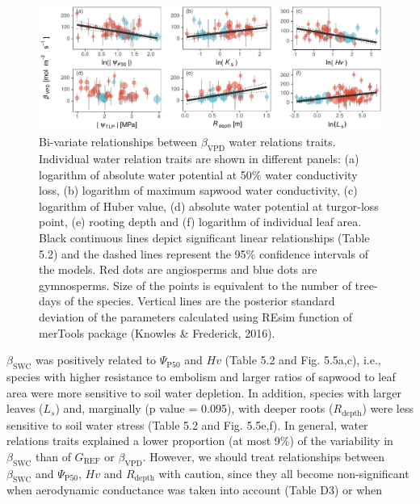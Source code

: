 \documentclass[11pt,twoside]{reedthesis}
\begin{document}
\begin{figure}[hbt!]

{\centering \includegraphics[width=1\linewidth]{figure/CH5/Figure_4} 

}

\caption[Bi-variate relationships between $\beta_{\text{VPD}}$ water relations traits.]{Bi-variate relationships between $\beta_{\text{VPD}}$ water relations traits. Individual water relation traits are shown in different panels: (a) logarithm of absolute water potential at 50\% water conductivity loss, (b) logarithm of maximum sapwood water conductivity, (c) logarithm of Huber value, (d) absolute water potential at turgor-loss point, (e) rooting depth and (f) logarithm of individual leaf area. Black continuous lines depict significant linear relationships (Table 5.2) and the dashed lines represent the 95\% confidence intervals of the models. Red dots are angiosperms and blue dots are gymnosperms. Size of the points is equivalent to the number of tree-days of the species. Vertical lines are the posterior standard deviation of the parameters calculated using REsim function of merTools package (Knowles \& Frederick, 2016).}\label{fig:ch5fig4}
\end{figure}
\(\beta_{\text{SWC}}\) was positively related to
\textbar{}\(\Psi_{\text{P50}}\)\textbar{} and \(Hv\) (Table 5.2 and Fig.
5.5a,c), i.e., species with higher resistance to embolism and larger
ratios of sapwood to leaf area were more sensitive to soil water
depletion. In addition, species with larger leaves (\(L_s\)) and,
marginally (p value = 0.095), with deeper roots (\(R_{\text{depth}}\))
were less sensitive to soil water stress (Table 5.2 and Fig. 5.5e,f). In
general, water relations traits explained a lower proportion (at most
9\%) of the variability in \(\beta_{\text{SWC}}\) than of
\(G_{\text{REF}}\) or \(\beta_{\text{VPD}}\). However, we should treat
relationships between \(\beta_{\text{SWC}}\) and
\textbar{}\(\Psi_{\text{P50}}\)\textbar{}, \(Hv\) and
\(R_{\text{depth}}\) with caution, since they all become non-significant
when aerodynamic conductance was taken into account (Table D3) or when
\end{document}
